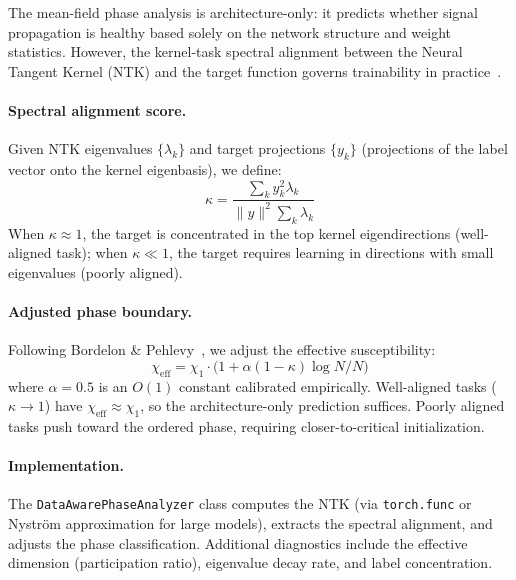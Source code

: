 \documentclass[10pt]{article}
\begin{document}
The mean-field phase analysis is architecture-only: it predicts whether signal propagation is healthy based solely on the network structure and weight statistics.
However, the kernel-task spectral alignment between the Neural Tangent Kernel (NTK) and the target function governs trainability in practice~\cite{bordelon2020spectrum}.

\paragraph{Spectral alignment score.}
Given NTK eigenvalues $\{\lambda_k\}$ and target projections $\{y_k\}$ (projections of the label vector onto the kernel eigenbasis), we define:
\begin{equation}
    \kappa = \frac{\sum_k y_k^2 \lambda_k}{\|y\|^2 \sum_k \lambda_k}
    \label{eq:alignment}
\end{equation}
When $\kappa \approx 1$, the target is concentrated in the top kernel eigendirections (well-aligned task); when $\kappa \ll 1$, the target requires learning in directions with small eigenvalues (poorly aligned).

\paragraph{Adjusted phase boundary.}
Following Bordelon \& Pehlevy~\cite{bordelon2020spectrum}, we adjust the effective susceptibility:
\begin{equation}
    \chi_{\mathrm{eff}} = \chi_1 \cdot \bigl(1 + \alpha(1 - \kappa)\log N / N\bigr)
    \label{eq:chi-eff}
\end{equation}
where $\alpha = 0.5$ is an $O(1)$ constant calibrated empirically.
Well-aligned tasks ($\kappa \to 1$) have $\chi_{\mathrm{eff}} \approx \chi_1$, so the architecture-only prediction suffices.
Poorly aligned tasks push toward the ordered phase, requiring closer-to-critical initialization.

\paragraph{Implementation.}
The \texttt{DataAwarePhaseAnalyzer} class computes the NTK (via \texttt{torch.func} or Nystr\"om approximation for large models), extracts the spectral alignment, and adjusts the phase classification.
Additional diagnostics include the effective dimension (participation ratio), eigenvalue decay rate, and label concentration.

\end{document}
